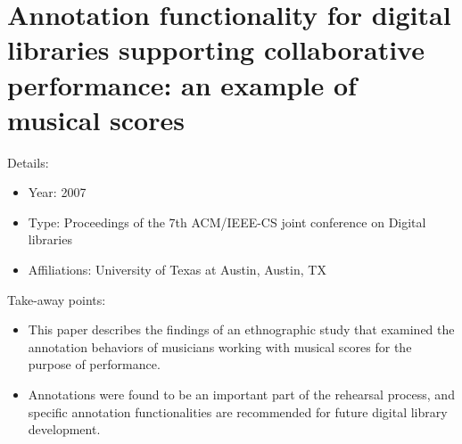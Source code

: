 \documentclass[12pt, onecolumn]{IEEEtran}
\begin{document}
\section{Annotation functionality for digital libraries supporting collaborative performance: an example of musical scores
\cite{Winget_2007}}
\noindent Details:
\begin{itemize}
  \item Year: 2007
  \item Type: Proceedings of the 7th ACM/IEEE-CS joint conference on Digital libraries
  \item Affiliations: University of Texas at Austin, Austin, TX
\end{itemize}
\medskip
Take-away points: 
\begin{itemize}
  \item This paper describes the findings of an ethnographic study that examined the annotation behaviors of musicians working with musical scores for the purpose of performance. 
  \item Annotations were found to be an important part of the rehearsal process, and specific annotation functionalities are recommended for future digital library development.
\end{itemize}
\bigskip\bigskip



\end{document}
